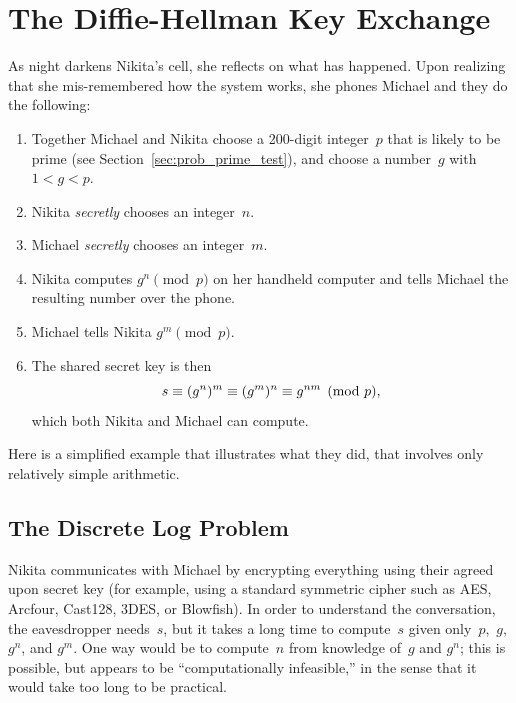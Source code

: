 \section{The Diffie-Hellman Key Exchange}\label{sec:diffie}
As night darkens Nikita's cell, she reflects on what has happened.
Upon realizing that she mis-remembered how the system works, she phones
Michael and they do the following:
\begin{enumerate}
\item Together Michael and Nikita choose a 200-digit integer~$p$ that
  is likely to be prime (see Section~\ref{sec:prob_prime_test}), and
  choose a number~$g$ with $1<g<p$.
\item Nikita {\em secretly} chooses an integer~$n$.
\item Michael {\em secretly} chooses an integer~$m$.
\item Nikita computes $g^n\pmod{p}$ on her handheld computer and tells
Michael the resulting number over the phone.
\item Michael tells Nikita $g^m\pmod{p}$.
\item The shared secret key is then
   $$
      s\equiv (g^n)^m \equiv (g^m)^n \equiv g^{nm}\pmod{p},
   $$
which both Nikita and Michael can compute.
\end{enumerate}

Here is a simplified example that illustrates what they did, that
involves only relatively simple arithmetic.
\begin{center}
\end{center}


\subsection{The Discrete Log Problem}\label{sec:dlog}
 Nikita communicates with Michael by
encrypting everything using their agreed upon secret key (for example, using
a standard symmetric cipher such as AES, Arcfour, Cast128, 3DES, or
Blowfish).  In order to understand the conversation, the eavesdropper
needs~$s$, but it takes a long time to compute~$s$ given
only~$p$,~$g$, $g^n$, and $g^m$.  One way would be to compute~$n$ from
knowledge of~$g$ and $g^n$; this is possible, but appears to be
``computationally infeasible,'' in the sense that it would take too
long to be practical.

